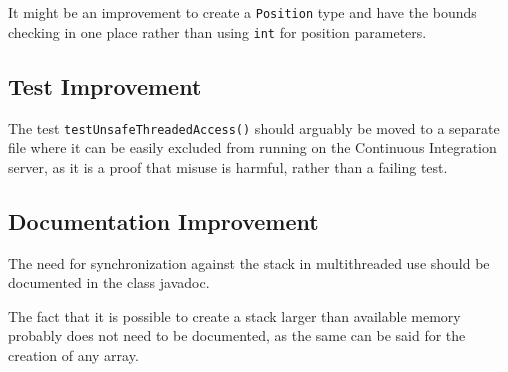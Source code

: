 \documentclass [12pt, a4paper, twoside, titlepage] {article}
\begin{document}
It might be an improvement to create  a \texttt{Position} type and have the bounds checking in 
one place rather than using \texttt{int} for position parameters.

\subsection{Test Improvement}
The test \texttt{testUnsafeThreadedAccess()} should arguably be moved to a separate file where it can 
be easily excluded from running on the Continuous Integration server, as it is a proof that misuse is harmful, 
rather than a failing test.  

\subsection{Documentation Improvement}
The need for synchronization against the stack in multithreaded use should be 
documented in the class javadoc.

The fact that it is possible to create a stack larger than available memory probably does not need to be documented, 
as the same can be said for the creation of any array.
\end{document}
